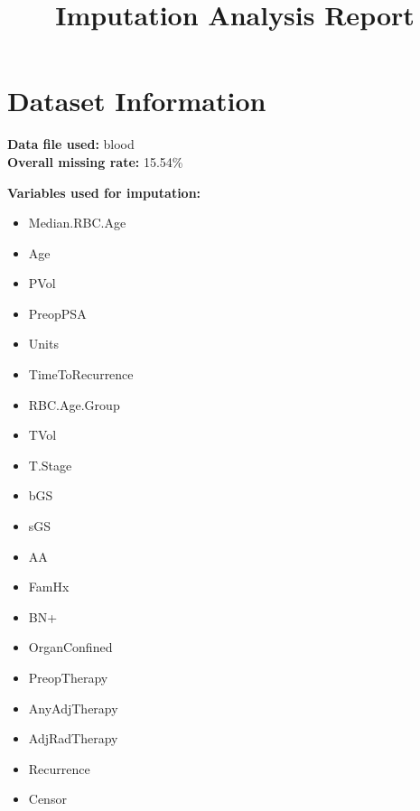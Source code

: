 \documentclass[
]{article}
\title{Imputation Analysis Report}
\author{}
\date{\vspace{-2.5em}}
\providecommand{\tightlist}{%
  \setlength{\itemsep}{0pt}\setlength{\parskip}{0pt}}
\begin{document}
\maketitle

\section{Dataset Information}\label{dataset-information}

\textbf{Data file used:} blood\\
\textbf{Overall missing rate:} 15.54\%

\textbf{Variables used for imputation:}

\begin{itemize}
\tightlist
\item
  Median.RBC.Age\\
\item
  Age\\
\item
  PVol\\
\item
  PreopPSA\\
\item
  Units\\
\item
  TimeToRecurrence\\
\item
  RBC.Age.Group\\
\item
  TVol\\
\item
  T.Stage\\
\item
  bGS\\
\item
  sGS\\
\item
  AA\\
\item
  FamHx\\
\item
  BN+\\
\item
  OrganConfined\\
\item
  PreopTherapy\\
\item
  AnyAdjTherapy\\
\item
  AdjRadTherapy\\
\item
  Recurrence\\
\item
  Censor
\end{itemize}
\end{document}
